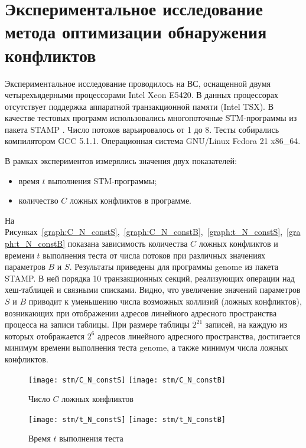 \section{Экспериментальное исследование метода оптимизации обнаружения конфликтов}
Экспериментальное исследование проводилось на ВС, оснащенной двумя четырехъядерными процессорами Intel Xeon E5420. В данных процессорах отсутствует поддержка аппаратной транзакционной памяти (Intel TSX). В качестве тестовых программ использовались многопоточные STM-программы из пакета STAMP \cite{spear_strategy_for_cm, spear_ringstm, dice_shavit_tl2}. Число потоков варьировалось от 1 до 8. Тесты собирались компилятором GCC 5.1.1. Операционная система GNU/Linux Fedora 21 x86\_64.

В рамках экспериментов измерялись значения двух показателей:
\begin{itemize}
\item время $t$ выполнения STM-программы;
\item количество $C$ ложных конфликтов в программе.
\end{itemize}

На Рисунках~\ref{graph:C_N_constS},~\ref{graph:C_N_constB},~\ref{graph:t_N_constS},~\ref{graph:t_N_constB} показана зависимость количества $C$ ложных конфликтов и времени $t$ выполнения теста от числа потоков при различных значениях параметров $B$ и $S$. Результаты приведены для программы genome из пакета STAMP. В ней порядка 10 транзакционных секций, реализующих операции над хеш-таблицей и связными списками. Видно, что увеличение значений параметров $S$ и $B$ приводит к уменьшению числа возможных коллизий (ложных конфликтов), возникающих при отображении адресов линейного адресного пространства процесса на записи таблицы. При размере таблицы $2^{21}$ записей, на каждую из которых отображается $2^{6}$ адресов линейного адресного пространства, достигается минимум времени выполнения теста genome, а также минимум числа ложных конфликтов.

\begin{figure}
    \centering
	{\texttt{[image: stm/C\_N\_constS]}}%
	{\texttt{[image: stm/C\_N\_constB]}}
    \caption{Число $C$ ложных конфликтов}
    \label{graph:C_N}
\end{figure}

\begin{figure}
    \centering
	{\texttt{[image: stm/t\_N\_constS]}}%
	{\texttt{[image: stm/t\_N\_constB]}}
    \caption{Время $t$ выполнения теста}
    \label{graph:t_N}
\end{figure}

